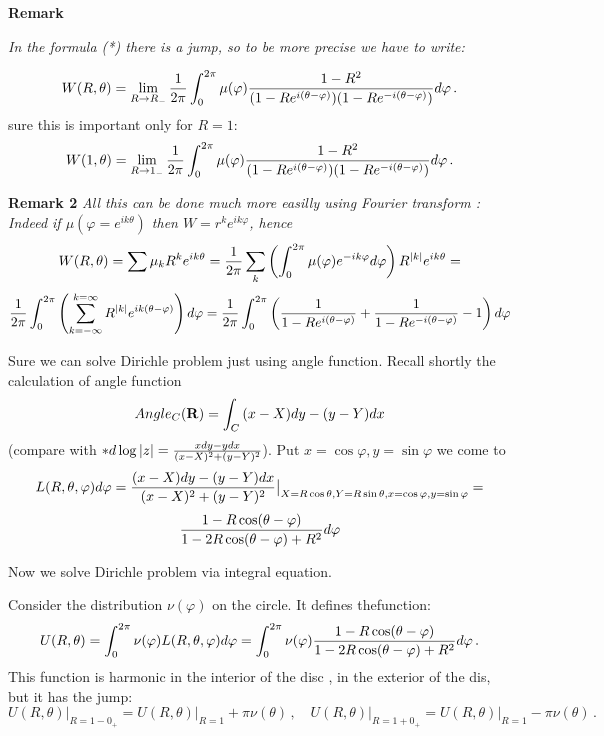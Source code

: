 {\bf Remark} {\it In the formula (*) there is a jump,
so to be more precise we have to write:

         $$
W(R,\theta)=\lim_{R\to R_-}{1\over 2\pi}
      \int_0^{2\pi}\mu(\varphi)
{1-R^2\over (1-Re^{ i(\theta-\varphi)})
            (1-Re^{-i(\theta-\varphi)})}d\varphi\,.
         $$
sure this is important only for $R=1$:
         $$
W(1,\theta)=\lim_{R\to 1_-}{1\over 2\pi}
      \int_0^{2\pi}\mu(\varphi)
{1-R^2\over (1-Re^{ i(\theta-\varphi)})
            (1-Re^{-i(\theta-\varphi)})}d\varphi\,.
         $$
}

{\bf Remark 2} {\it All this can be done much more easilly 
using Fourier transform :
Indeed if $\mu(\varphi=e^{ik\theta})$
then $W=r^ke^{ik\varphi}$, hence 
           $$
W(R,\theta)=\sum\mu_k R^k e^{ik\theta}=
  {1\over 2\pi}\sum_k\left(
   \int_0^{2\pi}\mu(\varphi)e^{-ik\varphi}d\varphi\right)
         R^{|k|} e^{ik\theta}=
           $$
      $$
     {1\over 2\pi}\int_0^{2\pi}
\left(\sum_{k=-\infty}^{k=\infty}
   R^{|k|}e^{ik(\theta-\varphi)}\right)
      d\varphi
      = {1\over 2\pi}\int_0^{2\pi}
\left(
{1\over 1-Re^{i(\theta-\varphi)}}+
{1\over 1-Re^{-i(\theta-\varphi)}}-1
\right)
      d\varphi
      $$
}

\m

Sure we can solve Dirichle problem
just using angle function.
  Recall shortly the calculation of
 angle function
            $$
       Angle_C({\bf R})=\int_C{(x-X)dy-(y-Y)dx} 
             $$
(compare with $*d\log|z|={xdy-ydx\over (x-X)^2+(y-Y)^2}$).
Put $x=\cos\varphi, y=\sin\varphi$ we come to
           $$
   L(R,\theta,\varphi)d\varphi=
  {(x-X)dy-(y-Y)dx\over (x-X)^2+(y-Y)^2}
\big\vert_
{X=R\cos\theta, Y=R\sin\theta,x=\cos\varphi,y=\sin\varphi}=
           $$
       $$
    {1-R\cos(\theta-\varphi)\over 
1-2R\cos(\theta-\varphi)+R^2}d\varphi
       $$

Now we solve Dirichle problem via integral equation.

  Consider the distribution $\nu(\varphi)$ on the circle.
  It defines thefunction:
              $$
     U(R,\theta)=
\int_0^{2\pi}\nu(\varphi)
    L(R,\theta,\varphi)d\varphi=
\int_0^{2\pi}\nu(\varphi)
    {1-R\cos(\theta-\varphi)\over 
1-2R\cos(\theta-\varphi)+R^2}d\varphi\,.
              $$
This function is harmonic in the interior of the disc
, in the exterior of the dis, but it has the jump:
            $$
    U(R,\theta)\big\vert_{R=1-0_+}=
    U(R,\theta)\big\vert_{R=1}+\pi\nu(\theta)\,,\quad
    U(R,\theta)\big\vert_{R=1+0_+}=
    U(R,\theta)\big\vert_{R=1}-\pi\nu(\theta)\,.
            $$

